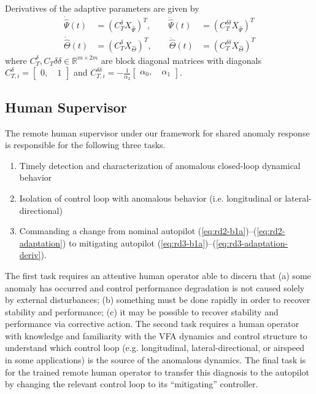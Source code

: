\documentclass[english]{ifacconf}
\begin{document}
Derivatives of the adaptive parameters are given by
\begin{equation}
\begin{aligned}
	\dot{\hat{\Psi}}(t) &= (C_T^\delta X_{\hat{\Psi}})^T, \qquad \ddot{\hat{\Psi}}(t) &= (C_T^{\delta\delta}X_{\hat{\Psi}})^T \\
	\dot{\hat{\Theta}}(t) &= (C_T^\delta X_{\hat{\Theta}})^T, \qquad \ddot{\hat{\Theta}}(t) &= (C_T^{\delta\delta}X_{\hat{\Theta}})^T
\end{aligned} \label{eq:rd3-adaptation-deriv}
\end{equation}
where $C_T^{\delta}, C_T{\delta \delta} \in \mathbb{R}^{m \times 2m}$ are block diagonal matrices with diagonals $C_{T,i}^{\delta} = \begin{bmatrix} 0,~ & 1	\end{bmatrix}$ and $C_{T,i}^{\delta\delta} = -\frac{1}{\alpha_2}\begin{bmatrix} \alpha_0,~ & \alpha_1 \end{bmatrix}$. 

\subsection{Human Supervisor}\label{subsec:sc_human}
The remote human supervisor under our framework for shared anomaly response is responsible for the following three tasks.
\begin{enumerate}
	\item Timely detection and characterization of anomalous closed-loop dynamical behavior
	\item Isolation of control loop with anomalous behavior (i.e. longitudinal or lateral-directional)
	\item Commanding a change from nominal autopilot (\ref{eq:rd2-b1a})--(\ref{eq:rd2-adaptation}) to mitigating autopilot (\ref{eq:rd3-b1a})--(\ref{eq:rd3-adaptation-deriv}).
\end{enumerate}

The first task requires an attentive human operator able to discern that (a) some anomaly has occurred and control performance degradation is not caused solely by external disturbances; (b) something must be done rapidly in order to recover stability and performance; (c) it may be possible to recover stability and performance via corrective action. The second task requires a human operator with knowledge and familiarity with the VFA dynamics and control structure to understand which control loop (e.g. longitudinal, lateral-directional, or airspeed in some applications) is the source of the anomalous dynamics. The final task is for the trained remote human operator to transfer this diagnosis to the autopilot by changing the relevant control loop to its ``mitigating'' controller.
\end{document}
